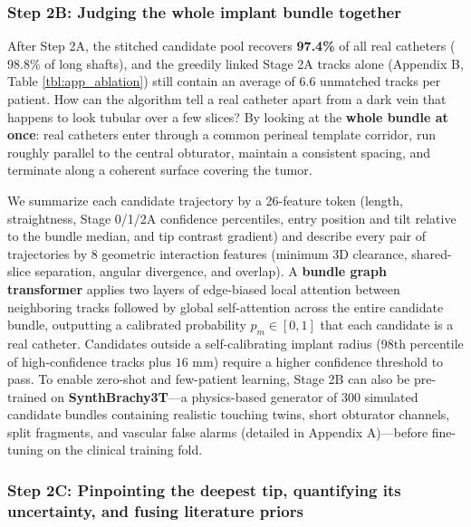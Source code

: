 \documentclass[
  11pt,
]{article}
\begin{document}
\subsubsection{Step 2B: Judging the whole implant bundle
together}\label{step-2b-judging-the-whole-implant-bundle-together}

After Step 2A, the stitched candidate pool recovers \textbf{97.4\%} of
all real catheters (\(98.8\%\) of long shafts), and the greedily linked
Stage 2A tracks alone (Appendix B, Table \ref{tbl:app_ablation}) still
contain an average of 6.6 unmatched tracks per patient. How can the
algorithm tell a real catheter apart from a dark vein that happens to
look tubular over a few slices? By looking at the \textbf{whole bundle
at once}: real catheters enter through a common perineal template
corridor, run roughly parallel to the central obturator, maintain a
consistent spacing, and terminate along a coherent surface covering the
tumor.

We summarize each candidate trajectory by a 26-feature token (length,
straightness, Stage 0/1/2A confidence percentiles, entry position and
tilt relative to the bundle median, and tip contrast gradient) and
describe every pair of trajectories by 8 geometric interaction features
(minimum 3D clearance, shared-slice separation, angular divergence, and
overlap). A \textbf{bundle graph transformer} applies two layers of
edge-biased local attention between neighboring tracks followed by
global self-attention across the entire candidate bundle, outputting a
calibrated probability \(p_m \in [0, 1]\) that each candidate is a real
catheter. Candidates outside a self-calibrating implant radius (98th
percentile of high-confidence tracks plus \(16\text{ mm}\)) require a
higher confidence threshold to pass. To enable zero-shot and few-patient
learning, Stage 2B can also be pre-trained on \textbf{SynthBrachy3T}---a
physics-based generator of 300 simulated candidate bundles containing
realistic touching twins, short obturator channels, split fragments, and
vascular false alarms (detailed in Appendix A)---before fine-tuning on
the clinical training fold.

\subsubsection{Step 2C: Pinpointing the deepest tip, quantifying its
uncertainty, and fusing literature
priors}\label{step-2c-pinpointing-the-deepest-tip-quantifying-its-uncertainty-and-fusing-literature-priors}
\end{document}
